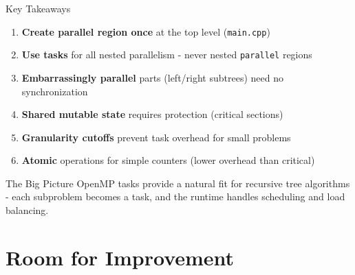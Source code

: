 \documentclass{beamer}
\begin{document}
\begin{frame}{Key Takeaways}
\begin{enumerate}
    \item \textbf{Create parallel region once} at the top level (\texttt{main.cpp})
    
    \item \textbf{Use tasks} for all nested parallelism - never nested \texttt{parallel} regions
    
    \item \textbf{Embarrassingly parallel} parts (left/right subtrees) need no synchronization
    
    \item \textbf{Shared mutable state} requires protection (critical sections)
    
    \item \textbf{Granularity cutoffs} prevent task overhead for small problems
    
    \item \textbf{Atomic} operations for simple counters (lower overhead than critical)
\end{enumerate}

\vspace{0.5em}
\begin{alertblock}{The Big Picture}
OpenMP tasks provide a natural fit for recursive tree algorithms - each subproblem becomes a task, and the runtime handles scheduling and load balancing.
\end{alertblock}
\end{frame}

\section{Room for Improvement}
\end{document}
